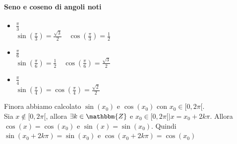 \documentclass[12pt]{report}
\begin{document}
	\paragraph{Seno e coseno di angoli noti}
	\begin{itemize}
		\item $\frac{\pi}{3}$ \\
		$\sin(\frac{\pi}{3}) = \frac{\sqrt{3}}{2} \quad \cos(\frac{\pi}{3}) = \frac{1}{2}$
		\item $\frac{\pi}{6}$ \\
		$\sin(\frac{\pi}{6}) = \frac{1}{2} \quad \cos(\frac{\pi}{6}) = \frac{\sqrt{3}}{2}$
		\item $\frac{\pi}{4}$ \\
		$\sin(\frac{\pi}{4}) = \cos(\frac{\pi}{4}) = \frac{\sqrt{2}}{2}$
	\end{itemize}
	Finora abbiamo calcolato $\sin(x_0)$ e $\cos(x_0)$ con $x_0 \in [0, 2\pi[$. \\
	Sia $x \notin [0, 2\pi[$, allora $\exists k \in \mathbbm{Z}$ e $x_0 \in [0, 2\pi[ \mid x = x_0 + 2k\pi$. Allora $\cos(x) = \cos(x_0)$ e $\sin(x)=\sin(x_0)$. Quindi $\sin(x_0+2k\pi) = \sin(x_0)$ e $\cos(x_0+2k\pi)=\cos(x_0)$
\end{document}
